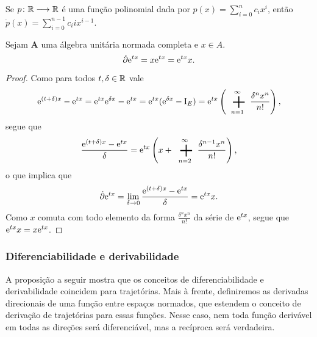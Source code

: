 \begin{exercise}
Se $p\colon \allowbreak \mathbb{R} \longrightarrow \mathbb{R}$ é uma função polinomial dada por $p(x) = \sum_{i=0}^n c_ix^i$, então $\dot{p}(x) = \sum_{i=0}^{n-1} c_i i x^{i-1}$.
\end{exercise}

\begin{proposition}
\label{prop:derivada.exponencial}
Sejam $\bm A$ uma álgebra unitária normada completa e $x \in A$.
	\begin{equation*}
	\dot{\partial} \mathrm{e}^{tx} = x \mathrm{e}^{tx} = \mathrm{e}^{tx} x.
	\end{equation*}
\end{proposition}
\begin{proof}
Como para todos $t,\delta \in \mathbb{R}$ vale
	\begin{equation*}
	\e^{(t+\delta)x} - \e^{tx} = \e^{tx} \e^{\delta x} - \e^{tx} = \e^{tx} (\e^{\delta x} - \Id_E) = \e^{tx} \left( \sum_{n=1}^{\infty} \frac{\delta^n x^n}{n!} \right),
	\end{equation*}
segue que
	\begin{equation*}
	\frac{\e^{(t+\delta)x} - \e^{tx}}{\delta} = \e^{tx} \left(x + \sum_{n=2}^{\infty} \frac{\delta^{n-1} x^n}{n!} \right),
	\end{equation*}
o que implica que
	\begin{equation*}
	\dot{\partial} \mathrm{e}^{tx} = \lim_{\delta \to 0} \frac{\mathrm{e}^{(t+\delta)x} - \mathrm{e}^{tx}}{\delta} = \mathrm{e}^{tx} x.
	\end{equation*}
Como $x$ comuta com todo elemento da forma $\frac{\delta^n x^n}{n!}$ da série de $\mathrm{e}^{tx}$, segue que $\mathrm{e}^{tx} x = x \mathrm{e}^{tx}$.
\end{proof}


\subsubsection{Diferenciabilidade e derivabilidade}

A proposição a seguir mostra que os conceitos de diferenciabilidade e derivabilidade coincidem para trajetórias. Mais à frente, definiremos as derivadas direcionais de uma função entre espaços normados, que estendem o conceito de derivação de trajetórias para essas funções. Nesse caso, nem toda função derivável em todas as direções será diferenciável, mas a recíproca será verdadeira.

